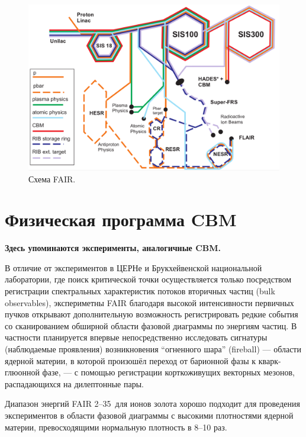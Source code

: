 \begin{figure}[H]
\includegraphics[width=1.0\textwidth]{pictures/FAIR_structure_3.png}
\caption{Схема FAIR.}
\label{fig:FAIRstructure3}
\end{figure}

\section{Физическая программа CBM}

\todo \textbf{Здесь упоминаются эксперименты, аналогичные CBM.}

В отличие от экспериментов в ЦЕРНе и Брукхейвенской национальной лаборатории, где поиск критической точки осуществляется только посредством регистрации спектральных характеристик потоков вторичных частиц (bulk observables), экспериметны FAIR благодаря высокой интенсивности первичных пучков открывают дополнительную возможность регистрировать редкие события со сканированием обширной области фазовой диаграммы по энергиям частиц. В частности планируется впервые непосредственно исследовать сигнатуры (наблюдаемые проявления) возникновения ``огненного шара'' (fireball) --- области ядерной материи, в которой произошёл переход от барионной фазы к кварк-глюонной фазе, --- с помощью регистрации корткоживущих векторных мезонов, распадающихся на дилептонные пары.

Диапазон энергий FAIR 2--35~\GeVperNucl для ионов золота хорошо подходит для проведения экспериментов в области фазовой диаграммы с высокими плотностями ядерной материи, превосходящими нормальную плотность в 8--10 раз.



